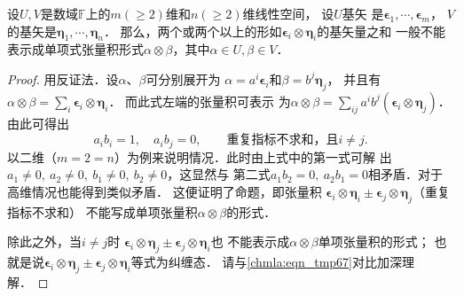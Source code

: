 
\begin{proposition}
    设$U,V$是数域$\mathbb{F}$上的$m(\geqslant 2)$维和$n(\geqslant 2)$维线性空间，
    设$U$基矢
    是$\boldsymbol{\epsilon}_1, \cdots, \boldsymbol{\epsilon}_m$，
    $V$的基矢是$\boldsymbol{\eta}_1, \cdots, \boldsymbol{\eta}_n$．
    那么，两个或两个以上的形如$\boldsymbol{\epsilon}_i \otimes \boldsymbol{\eta}_i$的基矢量之和
    一般不能表示成单项式张量积形式$\alpha \otimes \beta$，其中$\alpha \in U, \beta\in V$．
\end{proposition}
\begin{proof}
    用反证法．设$\alpha$、$\beta$可分别展开为
    $\alpha =a^i \boldsymbol{\epsilon}_i$和$\beta =b^j \boldsymbol{\eta}_j$，
    并且有$\alpha\otimes \beta = \sum_{i} \boldsymbol{\epsilon}_i \otimes\boldsymbol{\eta}_i$．
    而此式左端的张量积可表示
    为$\alpha\otimes \beta = \sum_{ij} a^i b^j (\boldsymbol{\epsilon}_i \otimes\boldsymbol{\eta}_j)$．
    由此可得出
    \begin{equation*}
        a_i b_i =  1, \quad a_i b_j =0, \qquad \text{重复指标不求和，且} i \neq j.
    \end{equation*}
    以二维（$m=2=n$）为例来说明情况．此时由上式中的第一式可解
    出$a_1\neq 0, \ a_2 \neq 0, \ b_1\neq 0, \ b_2 \neq 0$，这显然与
    第二式$a_1 b_2 =0,\ a_2 b_1 =0$相矛盾．对于高维情况也能得到类似矛盾．
    这便证明了命题，即张量积
    $\boldsymbol{\epsilon}_i \otimes \boldsymbol{\eta}_i \pm
    \boldsymbol{\epsilon}_j \otimes \boldsymbol{\eta}_j$（重复指标不求和）
    不能写成单项张量积$\alpha \otimes \beta$的形式．


    除此之外，当$i\neq j$时
    $\boldsymbol{\epsilon}_i \otimes \boldsymbol{\eta}_j \pm
    \boldsymbol{\epsilon}_j \otimes \boldsymbol{\eta}_i$也
    不能表示成$\alpha \otimes \beta$单项张量积的形式；
    也就是说$\boldsymbol{\epsilon}_i \otimes \boldsymbol{\eta}_j \pm
    \boldsymbol{\epsilon}_j \otimes \boldsymbol{\eta}_i$等式为纠缠态．
    请与\eqref{chmla:eqn_tmp67}对比加深理解．
\end{proof}



